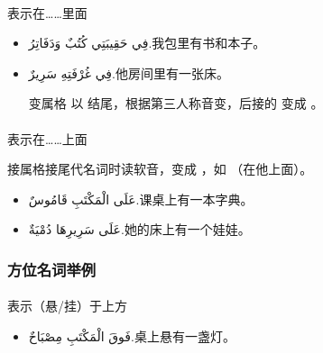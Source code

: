 \paragraph{} 表示在……里面

\begin{itemize}
    \item \ac{فِي حَقِيبَتِي كُتُبٌ وَدَفَاتِرُ.}{我包里有书和本子。}
    \item \ac{فِي غُرْفَتِهِ سَرِيرٌ.}{他房间里有一张床。}
    \begin{attention}
         变属格  以  结尾，根据第三人称音变，后接的  变成 。
    \end{attention}
\end{itemize}

\paragraph{} 表示在……上面
    
\begin{attention}
     接属格接尾代名词时读软音，变成  ，如  （在他上面）。
\end{attention}

\begin{itemize}
    \item \ac{عَلَى الْمَكْتَبِ قَامُوسٌ.}{课桌上有一本字典。}
    \item \ac{عَلَى سَرِيرِهَا دُمْيَةٌ.}{她的床上有一个娃娃。}
\end{itemize}


\subsubsection{方位名词举例}

\paragraph{} 表示（悬/挂）于上方

\begin{itemize}
    \item \ac{فَوقَ الْمَكْتَبِ مِصْبَاحٌ.}{桌上悬有一盏灯。}
\end{itemize}

\begin{note}
    \begin{center}
        
        
    \end{center}
\end{note}

